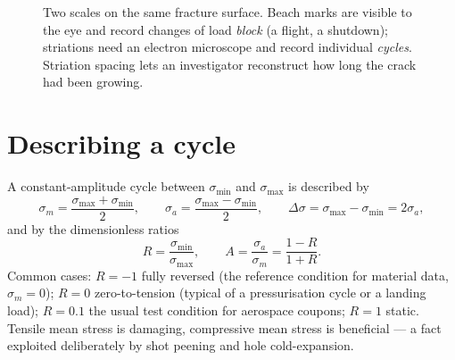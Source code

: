 \documentclass[11pt,a4paper]{article}
\begin{document}
\begin{figure}[H]\centering


\caption{Two scales on the same fracture surface. Beach marks are visible to the eye and record changes of load \emph{block} (a flight, a shutdown); striations need an electron microscope and record individual \emph{cycles}. Striation spacing lets an investigator reconstruct how long the crack had been growing.}
\label{fig:striation}
\end{figure}

\section{Describing a cycle}

A constant-amplitude cycle between $\sigma_{\min}$ and $\sigma_{\max}$ is described by
\begin{equation}
  \sigma_m=\frac{\sigma_{\max}+\sigma_{\min}}{2},\qquad
  \sigma_a=\frac{\sigma_{\max}-\sigma_{\min}}{2},\qquad
  \Delta\sigma = \sigma_{\max}-\sigma_{\min}=2\sigma_a,
\end{equation}
and by the dimensionless ratios
\begin{equation}
  R=\frac{\sigma_{\min}}{\sigma_{\max}},\qquad A=\frac{\sigma_a}{\sigma_m}=\frac{1-R}{1+R}.
\end{equation}
Common cases: $R=-1$ fully reversed (the reference condition for material data, $\sigma_m=0$); $R=0$ zero-to-tension (typical of a pressurisation cycle or a landing load); $R=0.1$ the usual test condition for aerospace coupons; $R=1$ static. Tensile mean stress is damaging, compressive mean stress is beneficial --- a fact exploited deliberately by shot peening and hole cold-expansion.
\end{document}
